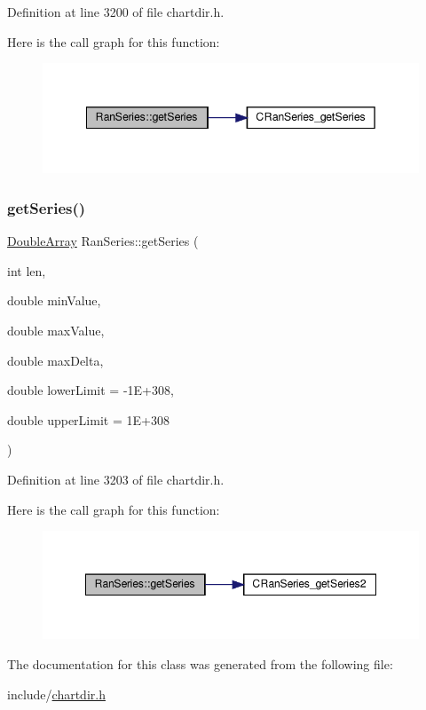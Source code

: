 Definition at line 3200 of file chartdir.\+h.

Here is the call graph for this function\+:
\nopagebreak
\begin{figure}[H]
\begin{center}
\leavevmode
\includegraphics[width=342pt]{class_ran_series_a2bfeae67f518cc2273f8aa3d8e6c8408_cgraph}
\end{center}
\end{figure}
\mbox{\label{class_ran_series_a0bab27ee1b15bf4d19d7c4b14fd975de}} 
\subsubsection{\texorpdfstring{get\+Series()}{getSeries()}\hspace{0.1cm}{\footnotesize\ttfamily [2/2]}}
{\footnotesize\ttfamily \hyperlink{class_double_array}{Double\+Array} Ran\+Series\+::get\+Series (\begin{DoxyParamCaption}\item[{int}]{len,  }\item[{double}]{min\+Value,  }\item[{double}]{max\+Value,  }\item[{double}]{max\+Delta,  }\item[{double}]{lower\+Limit = {\ttfamily -\/1E+308},  }\item[{double}]{upper\+Limit = {\ttfamily 1E+308} }\end{DoxyParamCaption})\hspace{0.3cm}{\ttfamily [inline]}}



Definition at line 3203 of file chartdir.\+h.

Here is the call graph for this function\+:
\nopagebreak
\begin{figure}[H]
\begin{center}
\leavevmode
\includegraphics[width=348pt]{class_ran_series_a0bab27ee1b15bf4d19d7c4b14fd975de_cgraph}
\end{center}
\end{figure}


The documentation for this class was generated from the following file\+:\begin{DoxyCompactItemize}
\item 
include/\hyperlink{chartdir_8h}{chartdir.\+h}\end{DoxyCompactItemize}
